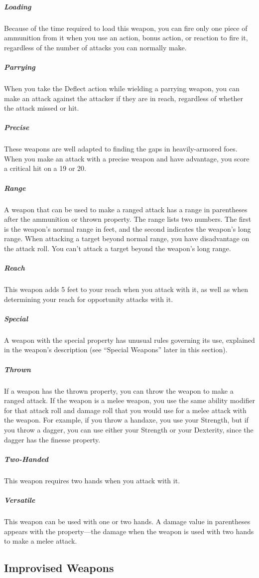 \subparagraph*{Loading} Because of the time required to load this weapon, you can fire only one piece of ammunition from it when you use an action, bonus action, or reaction to fire it, regardless of the number of attacks you can normally make.

\subparagraph*{Parrying} When you take the Deflect action while wielding a parrying weapon, you can make an attack against the attacker if they are in reach, regardless of whether the attack missed or hit.

\subparagraph*{Precise} These weapons are well adapted to finding the gaps in heavily-armored foes. When you make an attack with a precise weapon and have advantage, you score a critical hit on a 19 or 20.

\subparagraph*{Range} A weapon that can be used to make a ranged attack has a range in parentheses after the ammunition or thrown property. The range lists two numbers. The first is the weapon's normal range in feet, and the second indicates the weapon's long range. When attacking a target beyond normal range, you have disadvantage on the attack roll. You can't attack a target beyond the weapon's long range.

\subparagraph*{Reach} This weapon adds 5 feet to your reach when you attack with it, as well as when determining your reach for opportunity attacks with it.

\subparagraph*{Special} A weapon with the special property has unusual rules governing its use, explained in the weapon's description (see “Special Weapons” later in this section).

\subparagraph*{Thrown} If a weapon has the thrown property, you can throw the weapon to make a ranged attack. If the weapon is a melee weapon, you use the same ability modifier for that attack roll and damage roll that you would use for a melee attack with the weapon. For example, if you throw a handaxe, you use your Strength, but if you throw a dagger, you can use either your Strength or your Dexterity, since the dagger has the finesse property.

\subparagraph*{Two-Handed} This weapon requires two hands when you attack with it.

\subparagraph*{Versatile} This weapon can be used with one or two hands. A damage value in parentheses appears with the property—the damage when the weapon is used with two hands to make a melee attack.

\subsection{Improvised Weapons}


